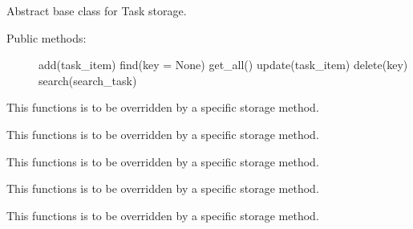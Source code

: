 \documentclass[letterpaper,10pt,english]{sphinxmanual}
\begin{document}
\begin{fulllineitems}
\label{index:storage.Storage}
Abstract base class for Task storage.
\begin{description}
\item[{Public methods:}] \leavevmode
add(task\_item)
find(key = None)
get\_all()
update(task\_item)
delete(key)
search(search\_task)

\end{description}


\begin{fulllineitems}
\label{index:storage.Storage.add}
This functions is to be overridden by a specific storage method.

\end{fulllineitems}



\begin{fulllineitems}
\label{index:storage.Storage.delete}
This functions is to be overridden by a specific storage method.

\end{fulllineitems}



\begin{fulllineitems}
\label{index:storage.Storage.find}
This functions is to be overridden by a specific storage method.

\end{fulllineitems}



\begin{fulllineitems}
\label{index:storage.Storage.get_all}
This functions is to be overridden by a specific storage method.

\end{fulllineitems}



\begin{fulllineitems}
\label{index:storage.Storage.search}
This functions is to be overridden by a specific storage method.


\end{fulllineitems}
\end{fulllineitems}
\end{document}
